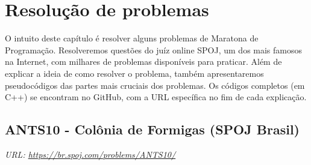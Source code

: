 \chapter{Resolução de problemas}
\label{cap:resolucao-problemas}

O intuito deste capítulo é resolver alguns problemas de Maratona de Programação. Resolveremos questões do juíz online SPOJ, um dos mais famosos na Internet, com milhares de problemas disponíveis para praticar. Além de explicar a ideia de como resolver o problema, também apresentaremos pseudocódigos das partes mais cruciais dos problemas. Os códigos completos (em C++) se encontram no GitHub, com a URL específica no fim de cada explicação.

\section{ANTS10 - Colônia de Formigas  (SPOJ Brasil)}

\textit{URL: \url{https://br.spoj.com/problems/ANTS10/}}

\vspace{0.3cm}

